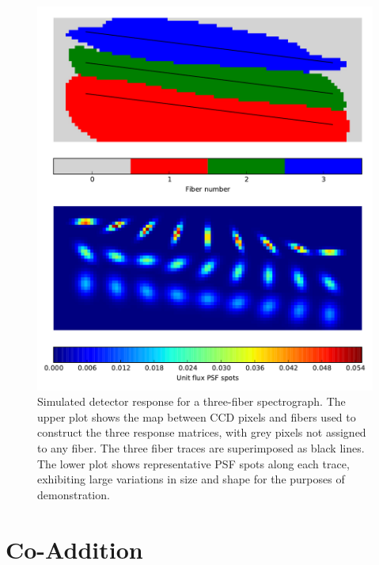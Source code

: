 \documentclass[12pt]{article}
\begin{document}
\begin{figure}[htb]
\begin{center}
\includegraphics[width=5.5in]{fig/detector}
\caption{Simulated detector response for a three-fiber spectrograph. The upper plot shows the map between CCD pixels and fibers used to construct the three response matrices, with grey pixels not assigned to any fiber. The three fiber traces are superimposed as black lines. The lower plot shows representative PSF spots along each trace, exhibiting large variations in size and shape for the purposes of demonstration.}
\label{fig:detector}
\end{center}
\end{figure}

\section{Co-Addition}
\end{document}
